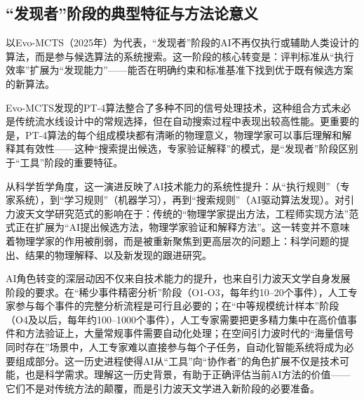 \subsection{“发现者”阶段的典型特征与方法论意义}

以Evo-MCTS（2025年）为代表，“发现者”阶段的AI不再仅执行或辅助人类设计的算法，而是参与候选算法的系统搜索。这一阶段的核心转变是：评判标准从“执行效率”扩展为“发现能力”——能否在明确约束和标准基准下找到优于既有候选方案的新算法。

Evo-MCTS发现的PT-4算法整合了多种不同的信号处理技术，这种组合方式未必是传统流水线设计中的常规选择，但在自动搜索过程中表现出较高性能。更重要的是，PT-4算法的每个组成模块都有清晰的物理意义，物理学家可以事后理解和解释其有效性——这种“搜索提出候选，专家验证解释”的模式，是“发现者”阶段区别于“工具”阶段的重要特征。

从科学哲学角度，这一演进反映了AI技术能力的系统性提升：从“执行规则”（专家系统），到“学习规则”（机器学习），再到“搜索规则”（AI驱动算法发现）。对引力波天文学研究范式的影响在于：传统的“物理学家提出方法，工程师实现方法”范式正在扩展为“AI提出候选方法，物理学家验证和解释方法”。这一转变并不意味着物理学家的作用被削弱，而是被重新聚焦到更高层次的问题上：科学问题的提出、结果的物理解释、以及新发现的跟进研究。

AI角色转变的深层动因不仅来自技术能力的提升，也来自引力波天文学自身发展阶段的要求。在“稀少事件精密分析”阶段（O1-O3，每年约10--20个事件），人工专家参与每个事件的完整分析流程是可行且必要的；在“中等规模统计样本”阶段（O4及以后，每年约100--1000个事件），人工专家需要把更多精力集中在高价值事件和方法验证上，大量常规事件需要自动化处理；在空间引力波时代的“海量信号同时存在”场景中，人工专家难以直接参与每个子任务，自动化智能系统将成为必要组成部分。这一历史进程使得AI从“工具”向“协作者”的角色扩展不仅是技术可能，也是科学需求。理解这一历史背景，有助于正确评估当前AI方法的价值——它们不是对传统方法的颠覆，而是引力波天文学进入新阶段的必要准备。


